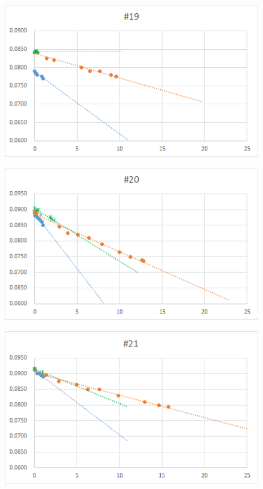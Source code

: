 \begin{figure}[htbp]
    \centering
       \includegraphics[width=120mm]{vol_019.png}
  \end{figure}
  \begin{figure}[htbp]
    \centering
       \includegraphics[width=120mm]{vol_020.png}
  \end{figure}
  \begin{figure}[htbp]
    \centering
       \includegraphics[width=120mm]{vol_021.png}
  \end{figure}
